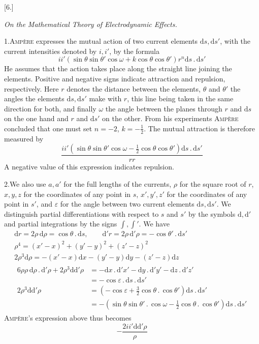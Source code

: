 \begin{center}[6.]\par\medskip\textit{On the Mathematical Theory of Electrodynamic Effects.}\end{center}
1.\quad \textsc{Ampère} expresses the mutual action of two current elements $\mathrm ds,\mathrm ds'$, with the current intensities denoted by $i,i'$, by the formula
\[
ii'(\sin\theta\sin\theta'\cos\omega+k\cos\theta\cos\theta')r^n\mathrm ds\,.\,\mathrm ds'
\]
He assumes that the action takes place along the straight line joining the elements. Positive and negative signs indicate attraction and repulsion, respectively. Here $r$ denotes the distance between the elements, $\theta$ and $\theta'$ the angles the elements $\mathrm ds,\mathrm ds'$ make with $r$, this line being taken in the same direction for both, and finally $\omega$ the angle between the planes through $r$ and $\mathrm ds$ on the one hand and $r$ and $\mathrm ds'$ on the other. From his experiments \textsc{Ampère} concluded that one must set $n=-2$, $k=-\frac{1}{2}$. The mutual attraction is therefore measured by
\[
\frac{ii'(\sin\theta\sin\theta'\cos\omega-\frac{1}{2}\cos\theta\cos\theta')\mathrm ds\,.\,\mathrm ds'}{rr}
\]
A negative value of this expression indicates repulsion.

2.\quad We also use $a,a'$ for the full lengths of the currents, $\rho$ for the square root of $r$, $x,y,z$ for the coordinates of any point in $s$, $x',y',z'$ for the coordinates of any point in $s'$, and $\varepsilon$ for the
angle between two current elements $\mathrm ds,\mathrm ds'$. We distinguish partial differentiations with respect to $s$ and $s'$ by the symbols $\mathrm d,\mathrm d'$ and partial integrations by the signs $\int,\int'$. We have
\[
\begin{gathered}
\mathrm dr=2\rho\,\mathrm d\rho=\cos\theta\,.\,\mathrm ds,\qquad \mathrm d'r=2\rho\,\mathrm d'\rho=-\cos\theta'\,.\,\mathrm ds'\\
\rho^4=(x'-x)^2+(y'-y)^2+(z'-z)^2\\
2\rho^3\mathrm d\rho=-(x'-x)\mathrm dx-(y'-y)\mathrm dy-(z'-z)\mathrm dz\\
\begin{aligned}
6\rho\rho\,\mathrm d\rho\,.\,\mathrm d'\rho+2\rho^3\mathrm d\mathrm d'\rho
&=-\mathrm dx\,.\,\mathrm d'x'-\mathrm dy\,.\,\mathrm d'y'-\mathrm dz\,.\,\mathrm d'z'\\
&=-\cos\varepsilon\,.\,\mathrm ds\,.\,\mathrm ds'\\
2\rho^3\mathrm d\mathrm d'\rho&=(-\cos\varepsilon+\tfrac{3}{2}\cos\theta\,.\,\cos\theta')\mathrm ds\,.\,\mathrm ds'\\
&=-(\sin\theta\sin\theta'\,.\,\cos\omega-\tfrac{1}{2}\cos\theta\,.\,\cos\theta')\mathrm ds\,.\,\mathrm ds'
\end{aligned}
\end{gathered}
\]
\textsc{Ampère}’s expression above thus becomes
\[
-\frac{2ii'\mathrm d\mathrm d'\rho}{\rho}
\]

